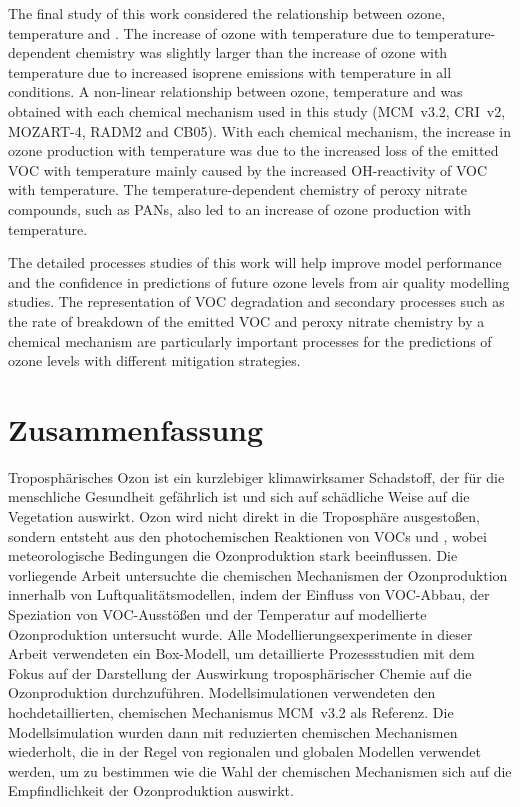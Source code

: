 The final study of this work considered the relationship between ozone, temperature and .
The increase of ozone with temperature due to temperature-dependent chemistry was slightly larger than the increase of ozone with temperature due to increased isoprene emissions with temperature in all  conditions.
A non-linear relationship between ozone, temperature and  was obtained with each chemical mechanism used in this study (MCM~v3.2, CRI~v2, MOZART-4, RADM2 and CB05).
With each chemical mechanism, the increase in ozone production with temperature was due to the increased loss of the emitted VOC with temperature mainly caused by the increased OH-reactivity of VOC with temperature.
The temperature-dependent chemistry of peroxy nitrate compounds, such as PANs, also led to an increase of ozone production with temperature.

The detailed processes studies of this work will help improve model performance and the confidence in predictions of future ozone levels from air quality modelling studies.
The representation of VOC degradation and secondary processes such as the rate of breakdown of the emitted VOC and peroxy nitrate chemistry by a chemical mechanism are particularly important processes for the predictions of ozone levels with different mitigation strategies.

\newpage
\section{Zusammenfassung}
Troposphärisches Ozon ist ein kurzlebiger klimawirksamer Schadstoff, der für die menschliche Gesundheit gefährlich ist und sich auf schädliche Weise auf die Vegetation auswirkt.
Ozon wird nicht direkt in die Troposphäre ausgestoßen, sondern entsteht aus den photochemischen Reaktionen von VOCs und , wobei meteorologische Bedingungen die Ozonproduktion stark beeinflussen.
Die vorliegende Arbeit untersuchte die chemischen Mechanismen der Ozonproduktion innerhalb von Luftqualitätsmodellen, indem der Einfluss von VOC-Abbau, der Speziation von VOC-Ausstößen und der Temperatur auf modellierte Ozonproduktion untersucht wurde.
Alle Modellierungsexperimente in dieser Arbeit verwendeten ein Box-Modell, um detaillierte Prozessstudien mit dem Fokus auf der Darstellung der Auswirkung troposphärischer Chemie auf die Ozonproduktion durchzuführen.
Modellsimulationen verwendeten den hochdetaillierten, chemischen Mechanismus MCM~v3.2 als Referenz. Die Modellsimulation wurden dann mit reduzierten chemischen Mechanismen wiederholt, die in der Regel von regionalen und globalen Modellen verwendet werden, um zu bestimmen wie die Wahl der chemischen Mechanismen sich auf die Empfindlichkeit der Ozonproduktion auswirkt.

